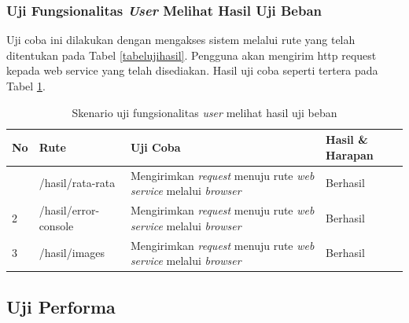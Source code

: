 			\subsubsection{Uji Fungsionalitas \textit{User} Melihat Hasil Uji Beban}
				Uji coba ini dilakukan dengan mengakses sistem melalui rute yang telah ditentukan pada Tabel \ref{tabelujihasil}. Pengguna akan mengirim http request kepada web service yang telah
				disediakan. Hasil uji coba seperti tertera pada Tabel \ref{tabelhasilujihasil}.
				\begin{longtable}{|p{}|p{}|p{0.30\textwidth}|p{}|}
					\caption{Skenario uji fungsionalitas \textit{user} melihat hasil uji beban} \label{tabelhasilujihasil} \\ \hline
					\textbf{No} & \textbf{Rute} & \textbf{Uji Coba} & \textbf{Hasil \& Harapan} \\ \hline
					\endhead
					\endfoot
					\endlastfoot
					1 & /hasil/rata-rata & Mengirimkan \textit{request} menuju rute \textit{web service} melalui \textit{browser} & Berhasil \\ \hline
					2 & /hasil/error-console & Mengirimkan \textit{request} menuju rute \textit{web service} melalui \textit{browser} & Berhasil \\ \hline
					3 & /hasil/images & Mengirimkan \textit{request} menuju rute \textit{web service} melalui \textit{browser} & Berhasil \\ \hline
				\end{longtable}
				

		\subsection{Uji Performa}